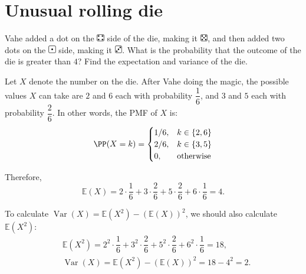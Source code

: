 \section{Unusual rolling die}
\begin{problem} %
 Vahe added a dot on the   \includegraphics[height=0.9em]{figs/4.png} side of the die, making it \includegraphics[height=0.9em]{figs/5.png}, and then added two dots on the \includegraphics[height=0.9em]{figs/1.png} side, making it \includegraphics[height=0.9em]{figs/3.png}.
   What is the probability that the outcome of the die is greater than $4$? Find the expectation and variance of the die.
\end{problem}
\bigskip
\begin{solution}
Let $X$ denote the number on the die. After Vahe doing the magic, the possible values $X$ can take are $2$ and $6$ each with probability $\dfrac{1}{6}$, and $3$ and $5$ each with probability $\dfrac{2}{6}$. In other words, the PMF of $X$ is:
\[
\PP(X=k) = \begin{cases}
    1/6, & k\in\{2,6\} \\
    2/6, & k\in\{3,5\} \\
    0, & \text{otherwise}
\end{cases}
\]

Therefore,
\[
\mathbb{E}(X) = 2 \cdot \dfrac{1}{6}  + 3 \cdot \dfrac{2}{6} + 5 \cdot \dfrac{2}{6} + 6 \cdot \dfrac{1}{6}   = 4.
\]

To calculate $\operatorname{Var}(X)=\mathbb{E}(X^2) - (\mathbb{E}(X))^2$, we should also calculate $\mathbb{E}(X^2)$:
\begin{align*}
    & \mathbb{E}(X^2) = 2^2 \cdot \dfrac{1}{6}  + 3^2 \cdot \dfrac{2}{6} + 5^2 \cdot \dfrac{2}{6} + 6^2 \cdot \dfrac{1}{6}   = 18, \\
    & \operatorname{Var}(X) =\mathbb{E}(X^2) - (\mathbb{E}(X))^2= 18 - 4^2 = 2.
\end{align*}

\end{solution}

